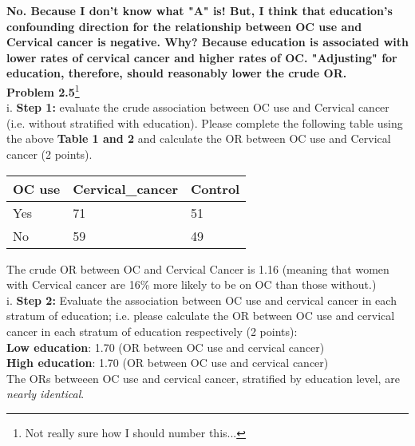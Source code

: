 \documentclass[12pt]{article}
\begin{document}
\textbf{No.  Because I don't know what "A" is! But, I think that education's confounding direction for the relationship between OC use and Cervical cancer is negative.  Why?  Because education is associated with lower rates of cervical cancer and higher rates of OC.  "Adjusting" for education, therefore, should reasonably lower the crude OR.} \\

\noindent \textbf{Problem 2.5}\footnote{Not really sure how I should number this...} \\

i. \textbf{Step 1:} evaluate the crude association between OC use and Cervical cancer (i.e. without stratified with education).  Please complete the following table using the above \textbf{Table 1 and 2} and calculate the OR between OC use and Cervical cancer (2 points).


\begin{table}[H]
\caption*{Crude table}
\begin{table}[ht]
\centering
\begin{tabular}{lll}
  \hline
OC use & Cervical\_cancer & Control \\ 
  \hline
Yes & 71 & 51 \\ 
  No & 59 & 49 \\ 
   \hline
\end{tabular}
\end{table}\end{table}

The crude OR between OC and Cervical Cancer is 1.16 (meaning that women with Cervical cancer are 16\% more likely to be on OC than those without.) \\

i. \textbf{Step 2:} Evaluate the association between OC use and cervical cancer in each stratum of education; i.e. please calculate the OR between OC use and cervical cancer in each stratum of education respectively (2 points): \\

\textbf{Low education}: 1.70 (OR between OC use and cervical cancer) \\

\textbf{High education}: 1.70 (OR between OC use and cervical cancer) \\

The ORs betweeen OC use and cervical cancer, stratified by education level, are \emph{nearly identical}. \\
\end{document}
